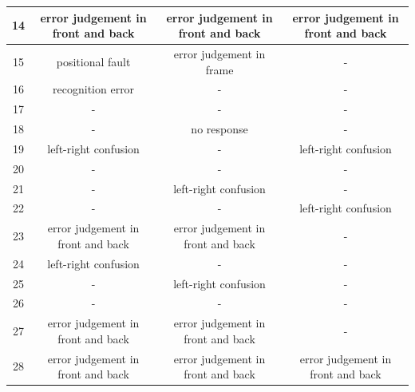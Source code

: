 \documentclass[journal,10pt]{IEEEtran}
\begin{document}
\begin{table}[ht]
{\begin{tabular}{|c|c|c|c|}
    14              & error judgement in front and back & error judgement in front and back & error judgement in front and back \\ \hline
    15              & positional fault                  & error judgement in frame          & -                                 \\ \hline
    16              & recognition error                 & -                                 & -                                 \\ \hline
    17              & -                                 & -                                 & -                                 \\ \hline
    18              & -                                 & no response                       & -                                 \\ \hline
    19              & left-right confusion              & -                                 & left-right confusion              \\ \hline
    20              & -                                 & -                                 & -                                 \\ \hline
    21              & -                                 & left-right confusion              & -                                 \\ \hline
    22              & -                                 & -                                 & left-right confusion              \\ \hline
    23              & error judgement in front and back & error judgement in front and back & -                                 \\ \hline
    24              & left-right confusion              & -                                 & -                                 \\ \hline
    25              & -                                 & left-right confusion              & -                                 \\ \hline
    26              & -                                 & -                                 & -                                 \\ \hline
    27              & error judgement in front and back & error judgement in front and back & -                                 \\ \hline
    28              & error judgement in front and back & error judgement in front and back & error judgement in front and back \\ \hline

\end{tabular}}
\end{table}
\end{document}
